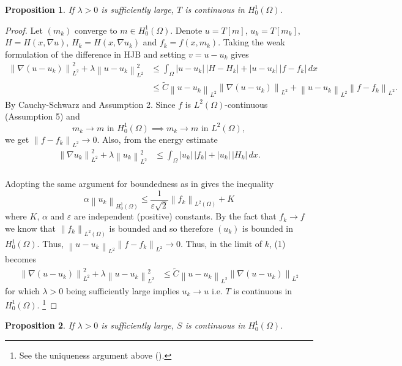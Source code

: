\documentclass[11pt]{article}
\numberwithin{equation}{section}
\newtheorem{proposition}[proposition]{Proposition}
\theoremstyle{definition}
\theoremstyle{remark}
\newcommand{\Ltwo}{L^2(\Omega)}
\newcommand{\Honez}{H_0^1(\Omega)}
\newcommand{\norm}[1]{\left\lVert #1 \right\rVert}
\begin{document}
\begin{proposition}
  \label{prop:t-cont}
  If $\lambda > 0$ is sufficiently large, $T$ is continuous in $\Honez$. 
\end{proposition}
\begin{proof}
  Let $(m_k)$ converge to $m \in \Honez$. Denote $u=T[m]$, $u_k=T[m_k]$, $H=H(x,\nabla u)$, $H_k = H(x, \nabla u_k)$ and $f_k = f(x, m_k)$.
  Taking the weak formulation of the difference in HJB and setting $v=u-u_k$ gives\\
  \begin{align*}
  \norm{\nabla(u-u_k)}_{L^2}^2+\lambda\norm{u-u_k}_{L^2}^2
  &\le \int_\Omega |u-u_k|\,|H-H_k| + |u-u_k|\,|f-f_k|\,dx\\[0.9em]
  &\le \tilde{C}\norm{u-u_k}_{L^2}\norm{\nabla(u-u_k)}_{L^2}
  + \norm{u-u_k}_{L^2}\norm{f-f_k}_{L^2}. \tag{1}
  \end{align*}
  By Cauchy-Schwarz and Assumption 2. Since $f$ is $\Ltwo$-continuous (Assumption 5) and 
  \[m_k \to m \text{ in } \Honez \implies m_k \to m \text{ in } \Ltwo,\]
  we get $\norm{f-f_k}_{L^2}\to 0$.
  Also, from the energy estimate
  \begin{align*}
  \norm{\nabla u_k}_{L^2}^2+\lambda\norm{u_k}_{L^2}^2
  &\le \int_\Omega  |u_k|\,|f_k| + |u_k|\,|H_k|\,dx.\\
  \end{align*}

Adopting the same argument for boundedness as in  gives the inequality
\[\alpha \norm{u_k}_{\Honez} \le \frac{1}{\varepsilon \sqrt{2}} \norm{f_k}_{\Ltwo}+ K\]
 where $K, \,\alpha $ and $\varepsilon$ are independent (positive) constants. By the fact that $f_k \to f$ we know that $\norm{f_k}_{\Ltwo}$ 
 is bounded and so therefore $(u_k)$ is bounded in $\Honez$.
Thus, ${\norm{u-u_k}_{L^2}\norm{f-f_k}_{L^2}\to 0}$. Thus, in the limit of $k$, (1) becomes
\begin{align*}
  \norm{\nabla(u-u_k)}_{L^2}^2+\lambda\norm{u-u_k}_{L^2}^2
  &\le \tilde{C}\norm{u-u_k}_{L^2}\norm{\nabla(u-u_k)}_{L^2}
  \end{align*}
for which $\lambda >0$ being sufficiently large implies $u_k\to u$ i.e. $T$ is continuous in $\Honez$.
\footnote{See the uniqueness argument above ().}
\end{proof}
\begin{proposition}
  \label{prop:s-cont}
  If $\lambda > 0$ is sufficiently large, $S$ is continuous in $\Honez$. 
\end{proposition}
\end{document}
